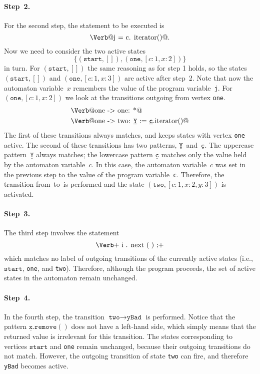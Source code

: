 \documentclass[preprint]{sigplanconf} %
\makeatletter
\newcommand{\pattern}[1]{\ensuremath{\mathtt{\underline{#1}}}}
\newcommand{\start}{\ensuremath{\mathtt{start}}\xspace}
\newcommand{\verbline}[2][]{\[\text{\Verb@#2@}#1\]}
\theoremstyle{definition}
\theoremstyle{remark}
\makeatother
\begin{document}
\paragraph{Step~2.}
For the second step, the statement to be executed is \verbline[.]{j = c.\PY{n+na}{iterator}()}
Now we need to consider the two active states \[\{(\start,[]), (\texttt{one},[c:1,x:2])\}\] in turn.
For $(\start,[])$ the same reasoning as for step 1 holds, so the states $(\start,[])$ and $(\mathtt{one},[c:1,x:3])$ are active after step~2.
Note that now the automaton variable~$x$ remembers the value of the program variable~{\tt j}.
For $(\texttt{one},[c:1,x:2])$ we look at the transitions outgoing from vertex {\tt one}.
\begin{align*}
&\text{\Verb@one -> one: *@} \\
&\text{\Verb@one -> two: \pattern Y := \pattern c.iterator()@}
\end{align*}
The first of these transitions always matches, and keeps states with vertex \texttt{one} active.
The second of these transitions has two patterns, \pattern Y~and~\pattern c.
The uppercase pattern~\pattern Y always matches;
the lowercase pattern \pattern c matches only the value held by the automaton variable~$c$.
In this case, the automaton variable~$c$ was set in the previous step to the value of the program variable~\texttt{c}.
Therefore, the transition from~\Verb@one@ to~\Verb@two@ is performed and the state $(\mathtt{two},[c:1,x:2,y:3])$ is activated.

\paragraph{Step~3.}

The third step involves the statement
\[\text{\Verb+\PY{n}{i}\PY{o}{.}\PY{n+na}{next}\PY{o}{(}\PY{o}{)}\PY{o}{;}+}\]
which matches no label of outgoing transitions of the currently active states (i.e., $\start$, {\tt one}, and {\tt  two}).
Therefore, although the program proceeds, the set of active states in the automaton remain unchanged.

\paragraph{Step~4.}

In the fourth step, the transition $\texttt{two}\to\texttt{yBad}$ is performed.
Notice that the pattern $\pattern{x}.\mathtt{remove}()$ does not have a left-hand side, which simply means that the returned value is irrelevant for this transition.
The states corresponding to vertices $\start$ and {\tt one} remain unchanged, because their outgoing transitions do not match.
However,  the outgoing transition of state {\tt two} can fire, and therefore {\tt yBad} becomes active.
\end{document}
